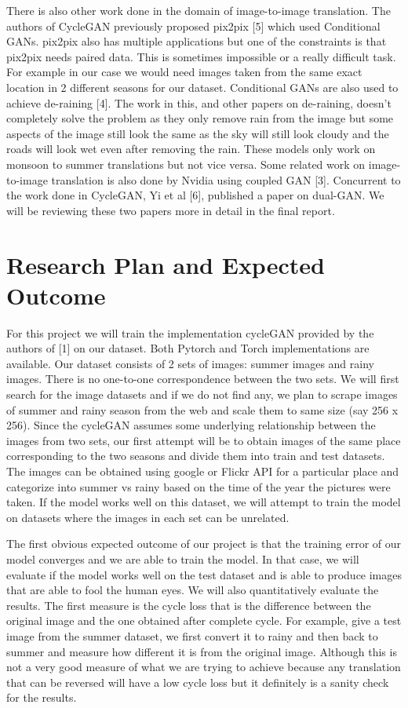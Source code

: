 \documentclass{article}
\begin{document}
There is also other work done in the domain of image-to-image translation. 
The authors of CycleGAN previously proposed pix2pix [5] which used 
Conditional GANs. pix2pix also has multiple applications but one of 
the constraints is that pix2pix needs paired data. This is sometimes 
impossible or a really difficult task. For example in our case we 
would need images taken from the same exact location in 2 different 
seasons for our dataset. Conditional GANs are also used to achieve 
de-raining [4]. The work in this, and other papers on de-raining, 
doesn’t completely solve the problem as they only remove rain from 
the image but some aspects of the image still look the same as 
the sky will still look cloudy and the roads will look wet even 
after removing the rain. These models only work on monsoon to summer 
translations but not vice versa. Some related work on image-to-image 
translation is also done by Nvidia using coupled GAN [3]. Concurrent 
to the work done in CycleGAN, Yi et al [6], published a paper on dual-GAN. 
We will be reviewing these two papers more in detail in the final report.

\section{Research Plan and Expected Outcome}
\label{headings}

For this project we will train the implementation cycleGAN provided by the 
authors of [1] on our dataset. Both Pytorch and Torch implementations are 
available. Our dataset consists of 2 sets of images: summer images and 
rainy images. There is no one-to-one correspondence between the two sets. 
We will first search for the image datasets and if we do not find any, we 
plan to scrape images of summer and rainy season from the web and scale 
them to same size (say 256 x 256). Since the cycleGAN assumes some 
underlying relationship between the images from two sets, our first 
attempt will be to obtain images of the same place corresponding to the 
two seasons and divide them into train and test datasets. The images can
be obtained using google or Flickr API for a particular place and 
categorize into summer vs rainy based on the time of the year the 
pictures were taken. If the model works well on this dataset, we will 
attempt to train the model on datasets where the images in each set can 
be unrelated.

The first obvious expected outcome of our project is that the training 
error of our model converges and we are able to train the model. In that 
case, we will evaluate if the model works well on the test dataset and is 
able to produce images that are able to fool the human eyes. We will also 
quantitatively evaluate the results. The first measure is the cycle loss 
that is the difference between the original image and the one obtained 
after complete cycle. For example, give a test image from the summer 
dataset, we first convert it to rainy and then back to summer and measure 
how different it is from the original image. Although this is not a very 
good measure of what we are trying to achieve because any translation that 
can be reversed will have a low cycle loss but it definitely is a sanity 
check for the results.
\end{document}
